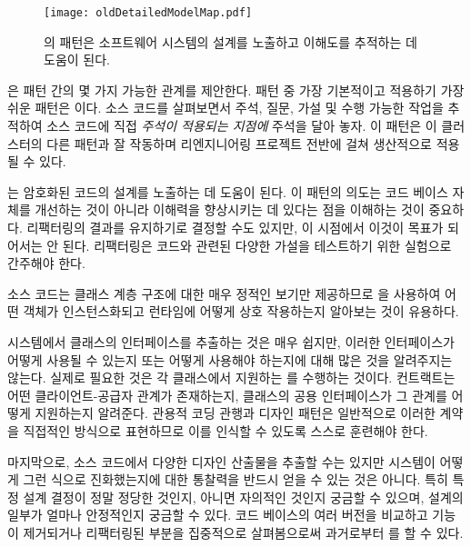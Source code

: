 \documentclass[a4paper,10pt,twoside]{book}
\begin{document}
\begin{figure}
\begin{center}
\texttt{[image: oldDetailedModelMap.pdf]}
\caption{의 패턴은 소프트웨어 시스템의 설계를 노출하고 이해도를 추적하는 데 도움이 된다.}
\end{center}
\end{figure}

은 패턴 간의 몇 가지 가능한 관계를 제안한다. 패턴 중 가장 기본적이고 적용하기 가장 쉬운 패턴은 이다. 소스 코드를 살펴보면서 주석, 질문, 가설 및 수행 가능한 작업을 추적하여 소스 코드에 직접 \emph{주석이 적용되는 지점에} 주석을 달아 놓자. 이 패턴은 이 클러스터의 다른 패턴과 잘 작동하며 리엔지니어링 프로젝트 전반에 걸쳐 생산적으로 적용될 수 있다.

는 암호화된 코드의 설계를 노출하는 데 도움이 된다. 이 패턴의 의도는 코드 베이스 자체를 개선하는 것이 아니라 이해력을 향상시키는 데 있다는 점을 이해하는 것이 중요하다. 리팩터링의 결과를 유지하기로 결정할 수도 있지만, 이 시점에서 이것이 목표가 되어서는 안 된다. 리팩터링은 코드와 관련된 다양한 가설을 테스트하기 위한 실험으로 간주해야 한다. 

소스 코드는 클래스 계층 구조에 대한 매우 정적인 보기만 제공하므로 을 사용하여 어떤 객체가 인스턴스화되고 런타임에 어떻게 상호 작용하는지 알아보는 것이 유용하다.

시스템에서 클래스의 인터페이스를 추출하는 것은 매우 쉽지만, 이러한 인터페이스가 어떻게 사용될 수 있는지 또는 어떻게 사용해야 하는지에 대해 많은 것을 알려주지는 않는다. 실제로 필요한 것은 각 클래스에서 지원하는 를 수행하는 것이다. 컨트랙트는 어떤 클라이언트-공급자 관계가 존재하는지, 클래스의 공용 인터페이스가 그 관계를 어떻게 지원하는지 알려준다. 관용적 코딩 관행과 디자인 패턴은 일반적으로 이러한 계약을 직접적인 방식으로 표현하므로 이를 인식할 수 있도록 스스로 훈련해야 한다.

마지막으로, 소스 코드에서 다양한 디자인 산출물을 추출할 수는 있지만 시스템이 어떻게 그런 식으로 진화했는지에 대한 통찰력을 반드시 얻을 수 있는 것은 아니다. 특히 특정 설계 결정이 정말 정당한 것인지, 아니면 자의적인 것인지 궁금할 수 있으며, 설계의 일부가 얼마나 안정적인지 궁금할 수 있다. 코드 베이스의 여러 버전을 비교하고 기능이 제거되거나 리팩터링된 부분을 집중적으로 살펴봄으로써 과거로부터 를 할 수 있다.
\end{document}
